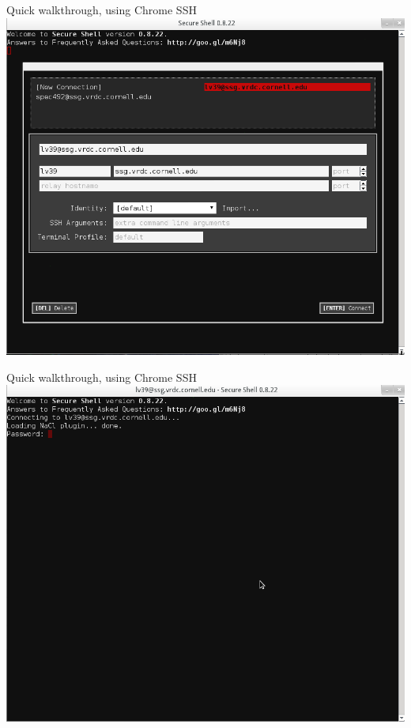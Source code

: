 \documentclass[xcolor=table,compress]{beamer}
\begin{document}
\begin{frame}{Quick walkthrough, using Chrome SSH}
\includegraphics[width=.9\textwidth]{chrome-ssh-screen1.png}
\end{frame}


\begin{frame}{Quick walkthrough, using Chrome SSH}
\includegraphics[width=.9\textwidth]{chrome-ssh-screen2.png}
\end{frame}
\end{document}
